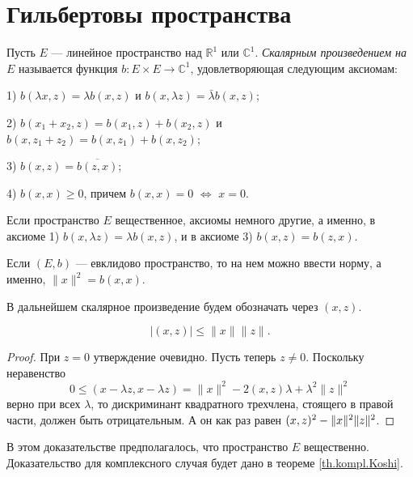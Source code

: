 \documentclass[10pt]{article}
\newcommand*{\p}[1]{#1\nobreak\discretionary{}{\hbox{$\mathsurround=0pt #1$}}{}}
\begin{document}


\vspace{-25pt}

\section{Гильбертовы пространства}

\begin{df}
Пусть $E$ --- линейное пространство над $\mathbb{R}^1$ или
$\mathbb{C}^1$. \emph{Скалярным произведением на $E$} называется
функция $b\colon E\times E\to\mathbb{C}^1$, удовлетворяющая
следующим аксиомам:

1) $b(\lambda x,z)=\lambda b(x,z)$ и $b(x,\lambda z)=\bar{\lambda}
b(x,z)$;

2) $b(x_1+x_2,z)=b(x_1,z)+b(x_2,z)$ и
$b(x,z_1+z_2)=b(x,z_1)+b(x,z_2)$;

3) $b(x,z)=\overline{b(z,x)}$;

4) $b(x,x)\geqslant 0$, причем $b(x,x)=0$ $\Leftrightarrow$ $x=0$.

Если пространство $E$ вещественное, аксиомы немного другие, а
именно, в аксиоме 1) $b(x,\lambda z)=\lambda b(x,z)$, и в аксиоме 3)
$b(x,z)=b(z,x)$.
\end{df}

Если $(E,b)$ --- евклидово пространство, то на нем можно ввести
норму, а именно, $\|x\|^2=b(x,x)$.

В дальнейшем скалярное произведение будем обозначать через $(x,z)$.

\begin{prop}
$$|(x,z)|\leqslant \|x\|\|z\|.$$
\end{prop}

\begin{proof}
При $z=0$ утверждение очевидно. Пусть теперь $z\neq 0$. Поскольку
неравенство
$$0\leqslant(x-\lambda z,x-\lambda z)=\|x\|^2-2(x,z)\lambda
+\lambda^2\|z\|^2$$ верно при всех $\lambda$, то дискриминант
квадратного трехчлена, стоящего в правой части, должен быть
отрицательным. А он как раз равен $(x,z)^2\p-\|x\|^2\|z\|^2$.
\end{proof}

\begin{note}
В этом доказательстве предполагалось, что пространство $E$
вещественно. Доказательство для комплексного случая будет дано в
теореме \ref{th.kompl.Koshi}.
\end{note}
\end{document}

